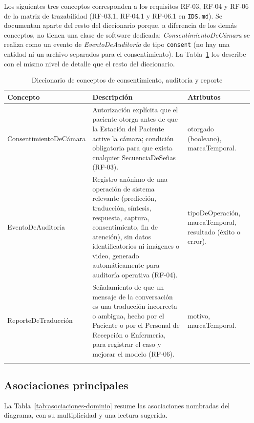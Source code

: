 Los siguientes tres conceptos corresponden a los requisitos RF-03,
RF-04 y RF-06 de la matriz de trazabilidad (RF-03.1, RF-04.1 y RF-06.1 en
\texttt{IDS.md}). Se documentan aparte del resto del diccionario porque, a
diferencia de los demás conceptos, no tienen una clase de software dedicada:
\textit{Consentimiento\-De\-Cámara}
se realiza como un evento de \textit{Evento\-De\-Auditoría} de tipo
\texttt{consent} (no hay una entidad ni un archivo separados para el
consentimiento). La Tabla~\ref{tab:diccionario-pendientes} los describe con
el mismo nivel de detalle que el resto del diccionario.

\begin{longtable}{p{3.6cm} p{5.4cm} p{5.4cm}}
    \toprule
    \textbf{Concepto} & \textbf{Descripción} & \textbf{Atributos} \\
    \midrule
    \endhead
    Consentimiento\-De\-Cámara &
    Autorización explícita que el paciente otorga antes de que la Estación
    del Paciente active la cámara; condición obligatoria para que exista
    cualquier Secuencia\-De\-Señas (RF-03). &
    otorgado (booleano), marcaTemporal. \\

    Evento\-De\-Auditoría &
    Registro anónimo de una operación de sistema relevante (predicción,
    traducción, síntesis, respuesta, captura, consentimiento, fin de
    atención), sin datos identificatorios ni imágenes o video, generado
    automáticamente para auditoría operativa (RF-04). &
    tipoDeOperación, marcaTemporal, resultado (éxito o error). \\

    Reporte\-De\-Traducción &
    Señalamiento de que un mensaje de la conversación es una traducción
    incorrecta o ambigua, hecho por el Paciente o por el Personal de
    Recepción o Enfermería, para registrar el caso y mejorar el modelo
    (RF-06). &
    motivo, marcaTemporal. \\
    \bottomrule
    \caption{Diccionario de conceptos de consentimiento, auditoría y reporte}
    \label{tab:diccionario-pendientes}
\end{longtable}

\subsection{Asociaciones principales}

La Tabla~\ref{tab:asociaciones-dominio} resume las asociaciones nombradas
del diagrama, con su multiplicidad y una lectura sugerida.

